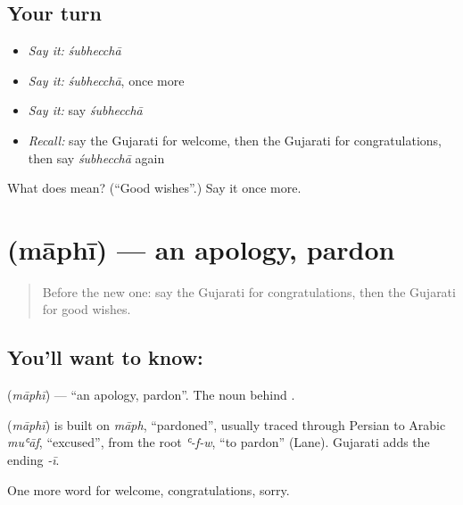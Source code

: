 \subsection*{Your turn}
\begin{itemize}
\raggedright
  \item \emph{Say it:} \emph{śubhecchā}
  \item \emph{Say it:} \emph{śubhecchā}, once more
  \item \emph{Say it:} say \emph{śubhecchā}
  \item \emph{Recall:} say the Gujarati for welcome, then the Gujarati for congratulations, then say \emph{śubhecchā} again
\end{itemize}

\begin{tcolorbox}[breakable,colback=teal!4,colframe=teal!35!black,title={Before you move on}]
What does  mean? (\textquotedblleft{}Good wishes\textquotedblright{}.) Say it once more.
\end{tcolorbox}
\section[\texorpdfstring{\gu{માફી} (māphī)}{માફી (māphī)}]{ (māphī) — an apology, pardon}

\label{lesson:GU-C91-apology}



\begin{quote}
Before the new one: say the Gujarati for congratulations, then the Gujarati for good wishes.
\end{quote}

\subsection*{You'll want to know: }
\textbf{} (\emph{māphī}) — \textquotedblleft{}an apology, pardon\textquotedblright{}. The noun behind \textbf{ }.

\begin{cousinweb}
\textbf{} (\emph{māphī}) is built on \emph{māph}, \textquotedblleft{}pardoned\textquotedblright{}, usually traced through Persian to Arabic \emph{muʿāf}, \textquotedblleft{}excused\textquotedblright{}, from the root \emph{ʿ-f-w}, \textquotedblleft{}to pardon\textquotedblright{} (Lane). Gujarati adds the ending \emph{-ī}.
\end{cousinweb}

\begin{grammarlens}[title={What you've built}]
One more word for welcome, congratulations, sorry.
\end{grammarlens}

